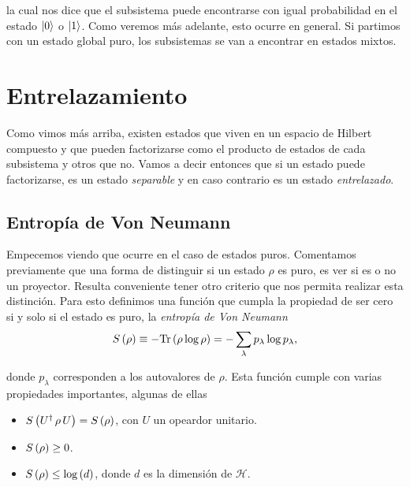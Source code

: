 \documentclass[../main.tex]{subfiles}
\begin{document}
\noindent la cual nos dice que el subsistema puede encontrarse con igual probabilidad en el estado $\left | 0 \right \rangle$ o $\left | 1 \right \rangle$. Como veremos más adelante, esto ocurre en general. Si partimos con un estado global puro, los subsistemas se van a encontrar en estados mixtos.

\section{Entrelazamiento}

Como vimos más arriba, existen estados que viven en un espacio de Hilbert compuesto y que pueden factorizarse como el producto de estados de cada subsistema y otros que no. Vamos a decir entonces que si un estado puede factorizarse, es un estado \textit{separable} y en caso contrario es un estado \textit{entrelazado}.

\subsection{Entropía de Von Neumann}

Empecemos viendo que ocurre en el caso de estados puros. Comentamos previamente que una forma de distinguir si un estado $\rho$ es puro, es ver si es o no un proyector. Resulta conveniente tener otro criterio que nos permita realizar esta distinción. Para esto definimos una función que cumpla la propiedad de ser cero si y solo si el estado es puro, la \textit{entropía de Von Neumann}
\begin{align}
	S\left ( \rho \right ) \equiv - \text{Tr}\left ( \rho \log \rho \right ) = - \sum_\lambda p_\lambda \log p_\lambda,
	\label{eq:ch2_von_neumann_entropy}
\end{align}

\noindent donde $p_\lambda$ corresponden a los autovalores de $\rho$. Esta función cumple con varias propiedades importantes, algunas de ellas


\begin{itemize}[label=$\bullet$]
	\item $S\left ( U^\dagger\, \rho\, U \right ) = S\left ( \rho \right )$, con $U$ un opeardor unitario.
	
	\item $S\left ( \rho \right ) \geq 0$.
	
	\item $S\left ( \rho \right ) \leq \log\left ( d \right )$, donde $d$ es la dimensión de $\mathcal H$.
\end{itemize}
\end{document}
